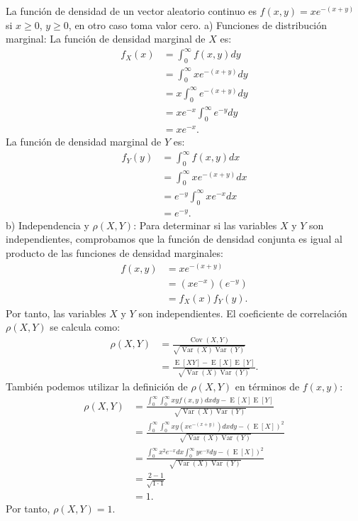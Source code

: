 \documentclass{article}
\begin{document}
 La funci\'on de densidad de un vector aleatorio continuo es $f(x, y) = xe^{-\left(x+y\right)}$ si $x \geq 0$, $y \geq 0$, en otro caso toma valor cero.
 a) Funciones de distribuci\'on marginal:
 La funci\'on de densidad marginal de $X$ es:
 \begin{align*}
f_X(x) &= \int_{0}^{\infty} f(x,y) dy \\
&= \int_{0}^{\infty} xe^{-\left(x+y\right)} dy \\
&= x\int_{0}^{\infty} e^{-\left(x+y\right)} dy \\
&= xe^{-x} \int_{0}^{\infty} e^{-y} dy \\
&= xe^{-x}.
\end{align*}
 La funci\'on de densidad marginal de $Y$ es:
 \begin{align*}
f_Y(y) &= \int_{0}^{\infty} f(x,y) dx \\
&= \int_{0}^{\infty} xe^{-\left(x+y\right)} dx \\
&= e^{-y} \int_{0}^{\infty} xe^{-x} dx \\
&= e^{-y}.
\end{align*}
 b) Independencia y $\rho(X,Y)$:
 Para determinar si las variables $X$ y $Y$ son independientes, comprobamos que la funci\'on de densidad conjunta es igual al producto de las funciones de densidad marginales:
 \begin{align*}
f(x,y) &= xe^{-\left(x+y\right)} \\
&= (xe^{-x})(e^{-y}) \\
&= f_X(x)f_Y(y).
\end{align*}
 Por tanto, las variables $X$ y $Y$ son independientes. 
 El coeficiente de correlaci\'on $\rho(X,Y)$ se calcula como:
 \begin{align*}
\rho(X,Y) &= \frac{\operatorname{Cov}(X,Y)}{\sqrt{\operatorname{Var}(X)\operatorname{Var}(Y)}} \\
&= \frac{\operatorname{E}[XY]-\operatorname{E}[X]\operatorname{E}[Y]}{\sqrt{\operatorname{Var}(X)\operatorname{Var}(Y)}}.
\end{align*}
 Tambi\'en podemos utilizar la definici\'on de $\rho(X,Y)$ en t\'erminos de $f(x,y)$:
 \begin{align*}
\rho(X,Y) &= \frac{\int_{0}^{\infty}\int_{0}^{\infty} xyf(x,y) dxdy - \operatorname{E}[X]\operatorname{E}[Y]}{\sqrt{\operatorname{Var}(X)\operatorname{Var}(Y)}} \\
&= \frac{\int_{0}^{\infty}\int_{0}^{\infty} xy(xe^{-\left(x+y\right)}) dxdy - (\operatorname{E}[X])^2}{\sqrt{\operatorname{Var}(X)\operatorname{Var}(Y)}} \\
&= \frac{\int_{0}^{\infty} x^2e^{-x} dx \int_{0}^{\infty} ye^{-y} dy - (\operatorname{E}[X])^2}{\sqrt{\operatorname{Var}(X)\operatorname{Var}(Y)}} \\
&= \frac{2 - 1}{\sqrt{1 \cdot 1}} \\
&= 1.
\end{align*}
 Por tanto, $\rho(X,Y) = 1$.
\end{document}
